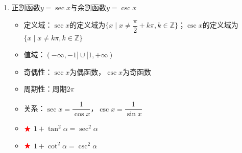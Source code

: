 \documentclass[../book.tex]{subfiles}
\begin{document}
\begin{enumerate}
\begin{itemize}
        \end{itemize}
        \item 正割函数$y = \sec x$与余割函数$y = \csc x$
        \begin{itemize}
            \item 定义域：$\sec x$的定义域为$\{x \mid x \neq \dfrac{\pi}{2} + k\pi, k \in \mathbb{Z}\}$；$\csc x$的定义域为$\{x \mid x \neq k\pi, k \in \mathbb{Z}\}$
            \item 值域：$(-\infty, -1] \cup [1, +\infty)$
            \item 奇偶性：$\sec x$为偶函数，$\csc x$为奇函数
            \item 周期性：周期$2\pi$
            \item 关系：$\sec x = \dfrac{1}{\cos x}$，$\csc x = \dfrac{1}{\sin x}$
            \item $\color{red}{\bigstar}$ $1 + \tan^2 \alpha = \sec^2 \alpha$
            \item $\color{red}{\bigstar}$ $1 + \cot^2 \alpha = \csc^2 \alpha$
        \end{itemize}
    \end{enumerate}
\end{document}
